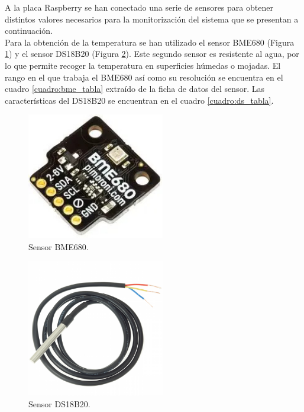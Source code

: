 A la placa Raspberry se han conectado una serie de sensores para obtener distintos valores necesarios para la monitorización del sistema que se presentan a continuación.\\

Para la obtención de la temperatura se han utilizado el sensor BME680 (Figura \ref{fig:bme_of}) y el sensor DS18B20 (Figura \ref{fig:ds_of}). Este segundo sensor es resistente al agua, por lo que permite recoger la temperatura en superficies húmedas o mojadas. El rango en el que trabaja el BME680 así como su resolución se encuentra en el cuadro \ref{cuadro:bme_tabla} extraído de la ficha de datos del sensor. Las características del DS18B20 se encuentran en el cuadro \ref{cuadro:ds_tabla}.\\
\begin{figure} [h!]
  \begin{center}
    \includegraphics[width=6cm]{figs/bme_of}
  \end{center}
  \caption{Sensor BME680.}
  \label{fig:bme_of}
\end{figure}

\begin{figure} [h!]
  \begin{center}
    \includegraphics[width=6cm]{figs/ds_of}
  \end{center}
  \caption{Sensor DS18B20.}
  \label{fig:ds_of}
\end{figure}

